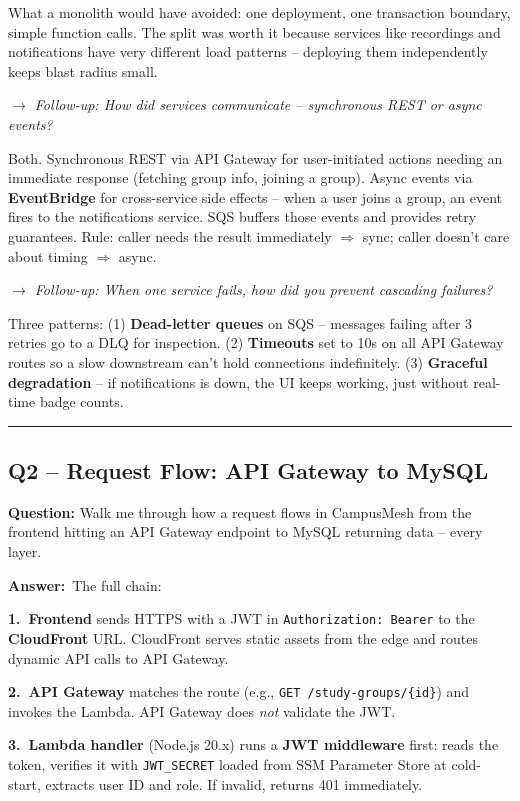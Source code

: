 \documentclass[letterpaper,10pt]{article}
\newlength{\boxwidth}
\newcommand{\questionbox}[1]{%
  \vspace{6pt}%
  \noindent\colorbox{qbg}{%
    \begin{minipage}{\boxwidth}%
      \vspace{3pt}\textbf{\textcolor{nordblue}{Question:}} #1\vspace{3pt}%
    \end{minipage}%
  }\vspace{2pt}%
}
\newcommand{\answerlabel}{\noindent\textbf{\textcolor{answerblue}{Answer:}}~}
\newcommand{\followup}[1]{\smallskip\noindent\textit{\textcolor{nordblue}{$\rightarrow$ Follow-up: #1}}\smallskip}
\begin{document}
What a monolith would have avoided: one deployment, one transaction boundary, simple function calls. The split was worth it because services like recordings and notifications have very different load patterns -- deploying them independently keeps blast radius small.

\followup{How did services communicate -- synchronous REST or async events?}

\noindent Both. Synchronous REST via API Gateway for user-initiated actions needing an immediate response (fetching group info, joining a group). Async events via \textbf{EventBridge} for cross-service side effects -- when a user joins a group, an event fires to the notifications service. SQS buffers those events and provides retry guarantees. Rule: caller needs the result immediately $\Rightarrow$ sync; caller doesn't care about timing $\Rightarrow$ async.

\followup{When one service fails, how did you prevent cascading failures?}

\noindent Three patterns: (1) \textbf{Dead-letter queues} on SQS -- messages failing after 3 retries go to a DLQ for inspection. (2) \textbf{Timeouts} set to 10s on all API Gateway routes so a slow downstream can't hold connections indefinitely. (3) \textbf{Graceful degradation} -- if notifications is down, the UI keeps working, just without real-time badge counts.

\medskip\rule{\linewidth}{0.2pt}

\subsection*{Q2 -- Request Flow: API Gateway to MySQL}

\questionbox{Walk me through how a request flows in CampusMesh from the frontend hitting an API Gateway endpoint to MySQL returning data -- every layer.}

\answerlabel The full chain:

\textbf{1.~Frontend} sends HTTPS with a JWT in \texttt{Authorization: Bearer} to the \textbf{CloudFront} URL. CloudFront serves static assets from the edge and routes dynamic API calls to API Gateway.

\textbf{2.~API Gateway} matches the route (e.g., \texttt{GET /study-groups/\{id\}}) and invokes the Lambda. API Gateway does \textit{not} validate the JWT.

\textbf{3.~Lambda handler} (Node.js 20.x) runs a \textbf{JWT middleware} first: reads the token, verifies it with \texttt{JWT\_SECRET} loaded from SSM Parameter Store at cold-start, extracts user ID and role. If invalid, returns 401 immediately.
\end{document}
